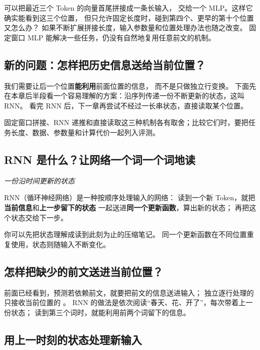 可以把最近三个 Token 的向量首尾拼接成一条长输入，
交给一个 MLP。这样它确实能看到这三个位置，
但只允许固定长度时，碰到第四个、更早的第十个位置又怎么办？
如果不断扩展拼接长度，输入参数量和位置处理办法也随之改变。
固定窗口 MLP 能解决一些任务，仍没有自然地复用任意前文的机制。

\subsection{新的问题：怎样把历史信息送给当前位置？}

我们需要让后一个位置\textbf{能利用}前面位置的信息，
而不是只做独立行变换。
下面先在本章后半段看一个容易理解的方案：沿序列传递一份不断更新的状态，这叫 RNN。
看完 RNN 后，下一章再尝试不经过一长串状态，直接读取某个位置。

固定窗口拼接、RNN 递推和直接读取这三种机制各有取舍；比较它们时，要把任务长度、数据、参数量和计算代价一起列入评测。

\subsection{RNN 是什么？让网络一个词一个词地读}
\label{concept:rnn}
\begin{idea}
\noindent\emph{一份沿时间更新的状态}\par

RNN（循环神经网络）是一种按顺序处理输入的网络：
读到一个新 Token，就把\textbf{当前信息}和\textbf{上一步留下的状态}
一起送进\textbf{同一个更新函数}，算出新的状态；
再把这个状态交给下一步。

你可以先把状态理解成读到此刻为止的压缩笔记。
同一个更新函数在不同位置重复使用，状态则随输入不断变化。
\end{idea}

\subsection{怎样把缺少的前文送进当前位置？}

前面已经看到，预测若依赖前文，就要把前文的信息送进输入；
独立逐行处理的  只接收当前位置的 。
RNN 的做法是依次阅读“春天、花、开了”，每次带着上一份状态；
读到第三个词时，就能利用前两个词留下的信息。

\subsection{用上一时刻的状态处理新输入}
\label{concept:hidden-state}

